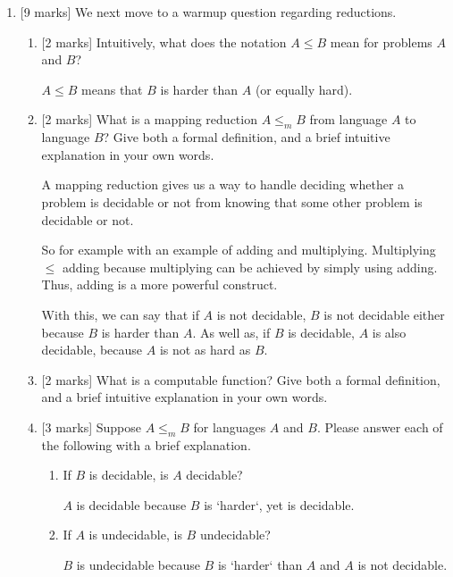 \documentclass{article}
\begin{document}
\begin{enumerate}
\begin{enumerate}
    \end{enumerate}
    \item {[9 marks]} We next move to a warmup question regarding reductions.
        \begin{enumerate}
            \item {[2 marks]} Intuitively, what does the notation $A\leq B$ mean for problems $A$ and $B$?

                    $A \leq B$ means that $B$ is harder than $A$ (or equally hard).

            \item {[2 marks]} What is a mapping reduction $A\leq_m B$ from language $A$ to language $B$? Give both a formal definition, and a brief intuitive explanation in your own words.

                            A mapping reduction gives us a way to handle deciding whether a problem is decidable or not from knowing that some other problem is decidable or not.

                            So for example with an example of adding and multiplying.
                            Multiplying $\leq$ adding because multiplying can be achieved by simply using adding. Thus, adding is a more powerful construct.

                            With this, we can say that if $A$ is not decidable, $B$ is not decidable either because $B$ is harder than $A$. As well as, if $B$ is decidable, $A$ is also decidable, because $A$ is not as hard as $B$.

            \item {[2 marks]} What is a computable function? Give both a formal definition, and a brief intuitive explanation in your own words.
            \item {[3 marks]} Suppose $A\leq_m B$ for languages $A$ and $B$. Please answer each of the following with a brief explanation.
                \begin{enumerate}
                    \item If $B$ is decidable, is $A$ decidable?

                            $A$ is decidable because $B$ is `harder`, yet is decidable.


                    \item If $A$ is undecidable, is $B$ undecidable?

                            $B$ is undecidable because $B$ is `harder` than $A$ and $A$ is not decidable.


\end{enumerate}
\end{enumerate}
\end{enumerate}
\end{document}
